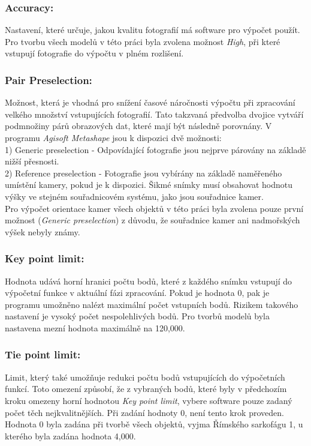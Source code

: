 \documentclass[a4paper, 12pt]{report}
\begin{document}
\subsubsection*{Accuracy:} 
Nastavení, které určuje, jakou kvalitu fotografií má software pro výpočet použít. Pro tvorbu všech modelů v této práci byla zvolena možnost \textit{High}, při které vstupují fotografie do výpočtu v plném rozlišení.

\subsubsection*{Pair Preselection:} Možnost, která je vhodná pro snížení časové náročnosti výpočtu při zpracování velkého množství vstupujících fotografií. Tato takzvaná předvolba dvojice vytváří podmnožiny párů obrazových dat, které mají být následně porovnány. V programu \textit{Agisoft Metashape} jsou k dispozici dvě možnosti: \\
1) Generic preselection - Odpovídající fotografie jsou nejprve párovány na základě nižší přesnosti. \\
2) Reference preselection - Fotografie jsou vybírány na základě naměřeného umístění kamery, pokud je k dispozici. Šikmé snímky musí obsahovat hodnotu výšky ve stejném souřadnicovém systému, jako jsou souřadnice kamer. \\
Pro výpočet orientace kamer všech objektů v této práci byla zvolena pouze první možnost (\textit{Generic preselection}) z důvodu, že souřadnice kamer ani nadmořských výšek nebyly známy. 

\subsubsection*{Key point limit:}
Hodnota udává horní hranici počtu bodů, které z každého snímku vstupují do výpočetní funkce v aktuální fázi zpracování. Pokud je hodnota 0, pak je programu umožněno nalézt maximální počet vstupních bodů. Rizikem takového nastavení je vysoký počet nespolehlivých bodů. Pro tvorbů modelů byla nastavena mezní hodnota maximálně na 120,000. 

\subsubsection*{Tie point limit:}
Limit, který také umožňuje redukci počtu bodů vstupujících do výpočetních funkcí. Toto omezení způsobí, že z vybraných bodů, které byly v předchozím kroku omezeny horní hodnotou \textit{Key point limit}, vybere software pouze zadaný počet těch nejkvalitnějších. Při zadání hodnoty 0, není tento krok proveden. Hodnota 0 byla zadána při tvorbě všech objektů, vyjma Římského sarkofágu 1, u kterého byla zadána hodnota 4,000.
\end{document}
